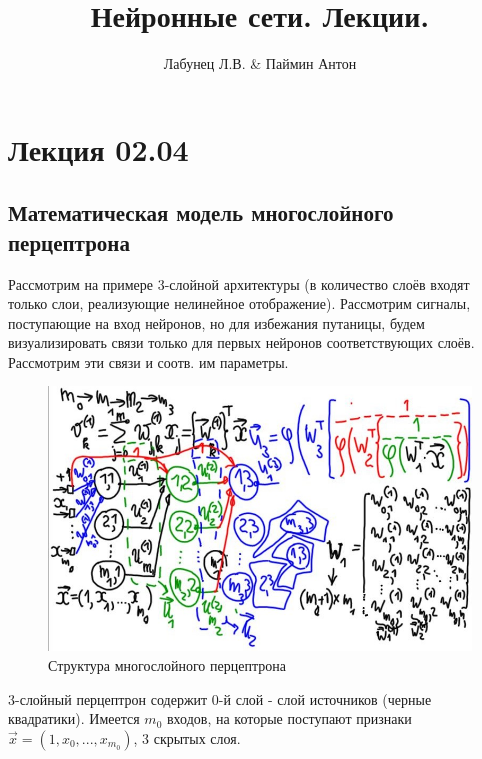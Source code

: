 \documentclass{article}
\numberwithin{equation}{subsection}
\begin{document}
\author{Лабунец Л.В. \& Паймин Антон}
\title{Нейронные сети. Лекции.}

\makeatletter
\begin{center}
    {\fontsize{14pt}{24pt}\selectfont\bfseries\@title\par}
    {\fontsize{14pt}{16pt}\@author\par}
\end{center}
\makeatother

\tableofcontents
\newpage

\section{Лекция 02.04}

\subsection{Математическая модель многослойного перцептрона}

Рассмотрим на примере 3-слойной архитектуры (в количество слоёв входят только 
слои, реализующие нелинейное отображение).
Рассмотрим сигналы, поступающие на вход нейронов, но для избежания 
путаницы, будем визуализировать связи только для первых нейронов соответствующих слоёв.
Рассмотрим эти связи и соотв. им параметры.

\begin{figure}[htbp]
    \centering
    \includegraphics[width=\textwidth]{hyperflat_3_1.jpeg}
    \caption{Структура многослойного перцептрона}
    \label{hyperflat_3_1}
\end{figure}

3-слойный перцептрон содержит 0-й слой - слой источников (черные квадратики). 
Имеется $m_{0}$ входов, на которые поступают признаки 
$\vec{x} = (1, x_0, ..., x_{m_{0}})$, 3 скрытых слоя.
\end{document}
